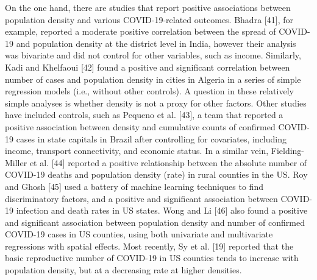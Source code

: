 \documentclass[10pt,letterpaper]{article}
\begin{document}
On the one hand, there are studies that report positive associations
between population density and various COVID-19-related outcomes. Bhadra
{[}41{]}, for example, reported a moderate positive correlation between
the spread of COVID-19 and population density at the district level in
India, however their analysis was bivariate and did not control for
other variables, such as income. Similarly, Kadi and Khelfaoui {[}42{]}
found a positive and significant correlation between number of cases and
population density in cities in Algeria in a series of simple regression
models (i.e., without other controls). A question in these relatively
simple analyses is whether density is not a proxy for other factors.
Other studies have included controls, such as Pequeno et al. {[}43{]}, a
team that reported a positive association between density and cumulative
counts of confirmed COVID-19 cases in state capitals in Brazil after
controlling for covariates, including income, transport connectivity,
and economic status. In a similar vein, Fielding-Miller et al. {[}44{]}
reported a positive relationship between the absolute number of COVID-19
deaths and population density (rate) in rural counties in the US. Roy
and Ghosh {[}45{]} used a battery of machine learning techniques to find
discriminatory factors, and a positive and significant association
between COVID-19 infection and death rates in US states. Wong and Li
{[}46{]} also found a positive and significant association between
population density and number of confirmed COVID-19 cases in US
counties, using both univariate and multivariate regressions with
spatial effects. Most recently, Sy et al. {[}19{]} reported that the
basic reproductive number of COVID-19 in US counties tends to increase
with population density, but at a decreasing rate at higher densities.
\end{document}
